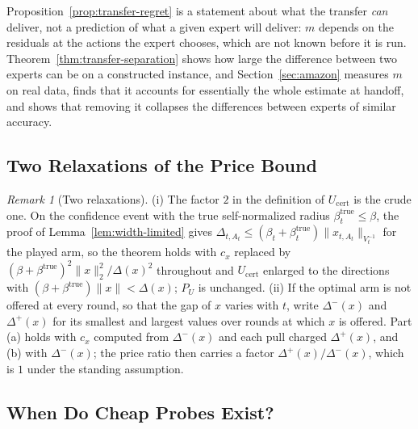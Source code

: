 \documentclass{article}
\theoremstyle{definition}
\theoremstyle{remark}
\newtheorem{remark}{Remark}
\theoremstyle{remark}
\begin{document}
Proposition~\ref{prop:transfer-regret} is a statement about what the transfer
\emph{can} deliver, not a prediction of what a given expert will deliver: $m$
depends on the residuals at the actions the expert chooses, which are not
known before it is run. Theorem~\ref{thm:transfer-separation} shows how large
the difference between two experts can be on a constructed instance, and
Section~\ref{sec:amazon} measures $m$ on real data, finds that it accounts for
essentially the whole estimate at handoff, and shows that removing it
collapses the differences between experts of similar accuracy.


\subsection{Two Relaxations of the Price Bound}
\label{app:relaxations}

\begin{remark}[Two relaxations]
\label{rem:relaxations}
(i) The factor $2$ in the definition of $U_{\mathrm{cert}}$ is the crude
one. On the confidence event with the true self-normalized radius
$\beta^{\mathrm{true}}_t\le\beta$, the proof of Lemma~\ref{lem:width-limited}
gives $\Delta_{t,A_t}\le(\beta_t+\beta^{\mathrm{true}}_t)\|x_{t,A_t}\|_{V_t^{-1}}$
for the played arm, so the theorem holds with $c_x$ replaced by
$(\beta+\beta^{\mathrm{true}})^2\|x\|_2^2/\Delta(x)^2$ throughout and
$U_{\mathrm{cert}}$ enlarged to the directions with
$(\beta+\beta^{\mathrm{true}})\|x\|<\Delta(x)$; $P_U$ is unchanged. (ii) If the
optimal arm is not offered at every round, so that the gap of $x$ varies
with $t$, write $\Delta^-(x)$ and $\Delta^+(x)$ for its smallest and largest
values over rounds at which $x$ is offered. Part (a) holds with $c_x$ computed
from $\Delta^-(x)$ and each pull charged $\Delta^+(x)$, and (b) with
$\Delta^-(x)$; the price ratio then carries a factor $\Delta^+(x)/\Delta^-(x)$,
which is $1$ under the standing assumption.
\end{remark}

\subsection{When Do Cheap Probes Exist?}
\label{app:cheap-probes}
\end{document}
